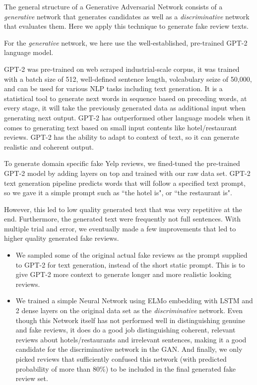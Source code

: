 \documentclass[conference, 11pt]{IEEEtran} %
\theoremstyle{plain}
\theoremstyle{definition}
\begin{document}
The general structure of a Generative Adversarial Network consists of a \textit{generative} network that generates candidates as well as a \textit{discriminative} network that evaluates them. Here we apply this technique to generate fake review texts.

For the \textit{generative} network, we here use the well-established, pre-trained GPT-2 language model.

GPT-2 was pre-trained on web scraped industrial-scale corpus, it was trained with a batch size of 512, well-defined sentence length, volcabulary seize of 50,000, and can be used for various NLP tasks including text generation. It is a statistical tool to generate next words in sequence based on preceding words, at every stage, it will take the previously generated data as additional input when generating next output. GPT-2 has outperformed other language models when it comes to generating text based on small input contents like hotel/restaurant reviews. GPT-2 has the ability to adapt to context of text, so it can generate realistic and coherent output. 

To generate domain specific fake Yelp reviews, we fined-tuned the pre-trained GPT-2 model by adding layers on top and trained with our raw data set. GPT-2 text generation pipeline predicts words that will follow a specified text prompt, so we gave it a simple prompt such as ``the hotel is", or ``the restaurant is".

However, this led to low quality generated text that was very repetitive at the end. Furthermore, the generated text were frequently not full sentences. With multiple trial and error, we eventually made a few improvements that led to higher quality generated fake reviews.
\begin{itemize}
\item We sampled some of the original actual fake reviews as the prompt supplied to GPT-2 for text generation, instead of the short static prompt. This is to give GPT-2 more context to generate longer and more realistic looking reviews.

\item We trained a simple Neural Network using ELMo embedding with LSTM and 2 dense layers on the original data set as the \textit{discriminative} network. Even though this Network itself has not performed well in distinguishing genuine and fake reviews, it does do a good job distinguishing coherent, relevant reviews about hotels/restaurants and irrelevant sentences, making it a good candidate for the discriminative network in the GAN. And finally, we only picked reviews that sufficiently confused this network (with predicted probability of more than 80\%) to be included in the final generated fake review set.
\end{itemize}
\end{document}
